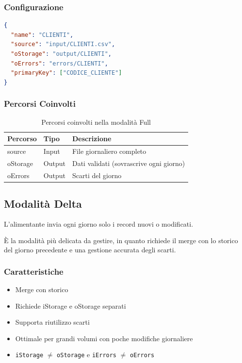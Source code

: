 \documentclass[12pt,a4paper,openright,twoside]{book}
\begin{document}
\subsubsection{Configurazione}

\begin{lstlisting}[language=JSON, caption={Esempio di configurazione in modalità Full}, label={lst:config-full}]
{
  "name": "CLIENTI",
  "source": "input/CLIENTI.csv",
  "oStorage": "output/CLIENTI",
  "oErrors": "errors/CLIENTI",
  "primaryKey": ["CODICE_CLIENTE"]
}
\end{lstlisting}

\subsubsection{Percorsi Coinvolti}

\begin{table}[H]
\centering\small
\begin{tabularx}{\textwidth}{>{\ttfamily}l l X}
\toprule
\normalfont\textbf{Percorso} & \textbf{Tipo} & \textbf{Descrizione} \\
\midrule
source   & Input  & File giornaliero completo \\
oStorage & Output & Dati validati (sovrascrive ogni giorno) \\
oErrors  & Output & Scarti del giorno \\
\bottomrule
\end{tabularx}
\caption{Percorsi coinvolti nella modalità Full}
\label{tab:percorsi-full}
\end{table}

\subsection{Modalità Delta}
L’alimentante invia ogni giorno solo i record nuovi o modificati. 

È la modalità più delicata da gestire, in quanto richiede il merge con lo storico del giorno precedente e una gestione accurata degli scarti.

\subsubsection{Caratteristiche}
\begin{itemize}
    \item Merge con storico 
    \item Richiede iStorage e oStorage separati
    \item Supporta riutilizzo scarti
    \item Ottimale per grandi volumi con poche modifiche giornaliere
    \item \texttt{iStorage} $\neq$ \texttt{oStorage} e \texttt{iErrors} $\neq$ \texttt{oErrors}
\end{itemize}
\end{document}
